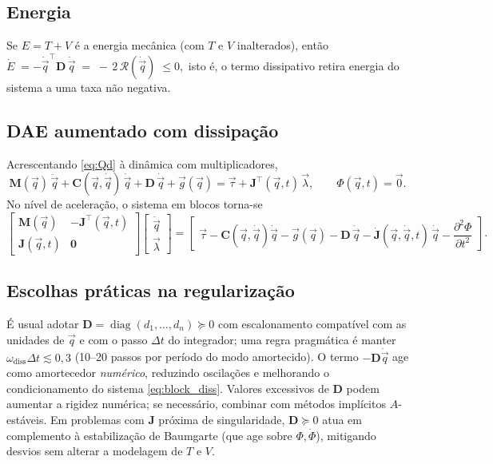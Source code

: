 \subsection{Energia}
Se $E=T+V$ é a energia mecânica (com $T$ e $V$ inalterados), então
$\dot E \;=-\dot{\vec q}^{\top}\mathbf D\,\dot{\vec q}\;=\;-\,2\,\mathcal R(\dot{\vec q}) \;\le 0,$
isto é, o termo dissipativo retira energia do sistema a uma taxa não negativa.

\subsection{DAE aumentado com dissipação}
Acrescentando \eqref{eq:Qd} à dinâmica com multiplicadores,
\begin{equation}
\mathbf M(\vec q)\,\ddot{\vec q}
+\mathbf C(\vec q,\dot{\vec q})\,\dot{\vec q}
+\mathbf D\,\dot{\vec q}
+\vec g(\vec q)
=\vec\tau+\mathbf J^{\top}(\vec q,t)\,\vec\lambda,
\qquad
\Phi(\vec q,t)=\vec 0.
\label{eq:dae_diss}
\end{equation}
No nível de aceleração, o sistema em blocos torna-se
\begin{equation}
\begin{bmatrix}
\mathbf M(\vec q) & -\mathbf J^{\top}(\vec q,t)\\
\mathbf J(\vec q,t) & \mathbf 0
\end{bmatrix}
\begin{bmatrix}
\ddot{\vec q}\\ \vec\lambda
\end{bmatrix}
=
\begin{bmatrix}
\vec\tau-\mathbf C(\vec q,\dot{\vec q})\dot{\vec q}-\vec g(\vec q)-\mathbf D\,\dot{\vec q}
-\dot{\mathbf J}(\vec q,\dot{\vec q},t)\,\dot{\vec q}-\dfrac{\partial^2 \Phi}{\partial t^2}
\end{bmatrix}.
\label{eq:block_diss}
\end{equation}

\subsection{Escolhas práticas na regularização}
É usual adotar
$\mathbf D=\operatorname{diag}(d_1,\ldots,d_n)\succeq 0$
com escalonamento compatível com as unidades de $\vec q$ e com o passo $\Delta t$ do integrador; uma regra pragmática é manter $\omega_{\text{diss}}\Delta t \lesssim 0{,}3$ (10–20 passos por período do modo amortecido).
O termo $-\mathbf D\dot{\vec q}$ age como amortecedor \emph{numérico}, reduzindo oscilações e melhorando o condicionamento do sistema \eqref{eq:block_diss}. Valores excessivos de $\mathbf D$ podem aumentar a rigidez numérica; se necessário, combinar com métodos implícitos $A$-estáveis. Em problemas com $\mathbf J$ próxima de singularidade, $\mathbf D\succeq 0$ atua em complemento à estabilização de Baumgarte (que age sobre $\Phi,\dot\Phi$), mitigando desvios sem alterar a modelagem de $T$ e $V$.

